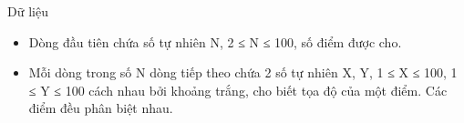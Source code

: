 Dữ liệu
\begin{itemize}
	\item     Dòng đầu tiên chứa số tự nhiên N, 2 ≤ N ≤ 100, số điểm được cho.   
	\item     Mỗi dòng trong số N dòng tiếp theo chứa 2 số tự nhiên X, Y, 1 ≤ X ≤ 100, 1 ≤ Y ≤ 100 cách nhau bởi khoảng trắng, cho biết tọa độ của một điểm. Các điểm đều phân biệt nhau.   
\end{itemize}